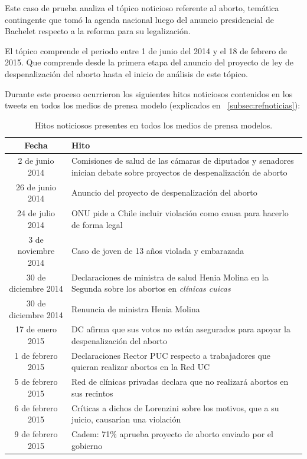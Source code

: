 
Este caso de prueba analiza el tópico noticioso referente al aborto, temática contingente que tomó la agenda nacional luego del anuncio presidencial de Bachelet respecto a la reforma para su legalización.

El tópico comprende el periodo entre 1 de junio del 2014 y el 18 de febrero de 2015. Que comprende desde la primera etapa del anuncio del proyecto de ley de despenalización del aborto hasta el inicio de análisis de este tópico. 

Durante este proceso ocurrieron los siguientes hitos noticiosos contenidos en los tweets en todos los medios de prensa modelo (explicados en ~\ref{subsec:refnoticias}):

\begin{table}[H]
	\centering
	\begin{tabular}{| c | p{10cm} |}
		\hline
		Fecha    & Hito \\ \hline
		2 de junio 2014 & Comisiones de salud de las cámaras de diputados y senadores inician debate sobre proyectos de despenalización de aborto \\ \hline
		26 de junio 2014 & Anuncio del proyecto de despenalización del aborto \\ \hline
		24 de julio 2014 & ONU pide a Chile incluir violación como causa para hacerlo de forma legal \\ \hline
		3 de noviembre 2014 & Caso de joven de 13 años violada y embarazada \\ \hline
		30 de diciembre 2014 & Declaraciones de ministra de salud Henia Molina en la Segunda sobre los abortos en \emph{clínicas cuicas}\\ \hline
		30 de diciembre 2014 & Renuncia de ministra Henia Molina \\ \hline
		17 de enero 2015 & DC afirma que sus votos no están asegurados para apoyar la despenalización del aborto \\ \hline
		1 de febrero 2015 & Declaraciones Rector PUC respecto a trabajadores que quieran realizar abortos en la Red UC \\ \hline
		5 de febrero 2015 & Red de clínicas privadas declara que no realizará abortos en sus recintos \\ \hline
		6 de febrero 2015 & Críticas a dichos de Lorenzini sobre los motivos, que a su juicio, causarían una violación \\ \hline
		9 de febrero 2015 & Cadem: 71\% aprueba proyecto de aborto enviado por el gobierno \\ \hline
	\end{tabular}
	\caption {Hitos noticiosos presentes en todos los medios de prensa modelos.}
	\label{table:123_hitos_noticiosos}
\end{table}

